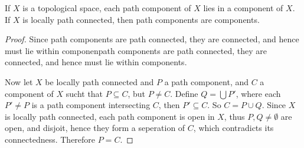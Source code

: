 \begin{theorem}\label{3.3.8}
    If $X$ is a topological space, each path component of  $X$ lies in a component of $X$. If $X$ is
    locally path connected, then path components are components.
\end{theorem}
\begin{proof}
    Since path components are path connected, they are connected, and hence must lie within
    componenpath components are path connected, they are connected, and hence must lie within
    components.

    Now let $X$ be locally path connected and  $P$ a path component, and  $C$ a component of  $X$
    sucht that  $P \subseteq C$, but  $P \neq C$. Define  $Q=\bigcup{P'}$, where each $P' \neq P$ is
    a path component intersecting  $C$, then  $P' \subseteq C$. So  $C=P \cup Q$. Since  $X$ is
    locally path connected, each path component is open in  $X$, thus  $P,Q \neq \emptyset$ are
    open, and disjoit, hence they form a seperation of $C$, which contradicts its connectedness.
    Therefore  $P=C$.
\end{proof}
